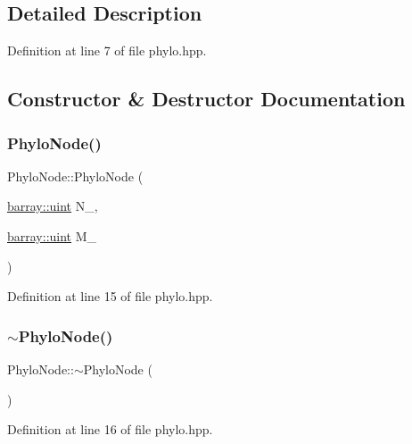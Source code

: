 \subsection{Detailed Description}


Definition at line 7 of file phylo.\+hpp.



\subsection{Constructor \& Destructor Documentation}
\mbox{\label{class_phylo_node_ae1a65ae64da5cd5b9ba154d5246f5409}} 
\subsubsection{\texorpdfstring{Phylo\+Node()}{PhyloNode()}}
{\footnotesize\ttfamily Phylo\+Node\+::\+Phylo\+Node (\begin{DoxyParamCaption}\item[{\hyperlink{namespacebarray_af9756a31953db233f80a9cfe1ef31c32}{barray\+::uint}}]{N\+\_\+,  }\item[{\hyperlink{namespacebarray_af9756a31953db233f80a9cfe1ef31c32}{barray\+::uint}}]{M\+\_\+ }\end{DoxyParamCaption})\hspace{0.3cm}{\ttfamily [inline]}}



Definition at line 15 of file phylo.\+hpp.

\mbox{\label{class_phylo_node_ac1753eafd402a1c709bed60c2a3d04bb}} 
\subsubsection{\texorpdfstring{$\sim$\+Phylo\+Node()}{~PhyloNode()}}
{\footnotesize\ttfamily Phylo\+Node\+::$\sim$\+Phylo\+Node (\begin{DoxyParamCaption}{ }\end{DoxyParamCaption})\hspace{0.3cm}{\ttfamily [inline]}}



Definition at line 16 of file phylo.\+hpp.



